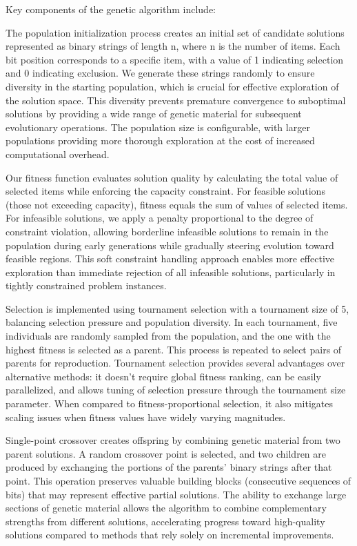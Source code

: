\documentclass[conference, a4paper]{IEEEtran}
\begin{document}
Key components of the genetic algorithm include:

The population initialization process creates an initial set of candidate solutions represented as binary strings of length n, where n is the number of items. Each bit position corresponds to a specific item, with a value of 1 indicating selection and 0 indicating exclusion. We generate these strings randomly to ensure diversity in the starting population, which is crucial for effective exploration of the solution space. This diversity prevents premature convergence to suboptimal solutions by providing a wide range of genetic material for subsequent evolutionary operations. The population size is configurable, with larger populations providing more thorough exploration at the cost of increased computational overhead.

Our fitness function evaluates solution quality by calculating the total value of selected items while enforcing the capacity constraint. For feasible solutions (those not exceeding capacity), fitness equals the sum of values of selected items. For infeasible solutions, we apply a penalty proportional to the degree of constraint violation, allowing borderline infeasible solutions to remain in the population during early generations while gradually steering evolution toward feasible regions. This soft constraint handling approach enables more effective exploration than immediate rejection of all infeasible solutions, particularly in tightly constrained problem instances.

Selection is implemented using tournament selection with a tournament size of 5, balancing selection pressure and population diversity. In each tournament, five individuals are randomly sampled from the population, and the one with the highest fitness is selected as a parent. This process is repeated to select pairs of parents for reproduction. Tournament selection provides several advantages over alternative methods: it doesn't require global fitness ranking, can be easily parallelized, and allows tuning of selection pressure through the tournament size parameter. When compared to fitness-proportional selection, it also mitigates scaling issues when fitness values have widely varying magnitudes.

Single-point crossover creates offspring by combining genetic material from two parent solutions. A random crossover point is selected, and two children are produced by exchanging the portions of the parents' binary strings after that point. This operation preserves valuable building blocks (consecutive sequences of bits) that may represent effective partial solutions. The ability to exchange large sections of genetic material allows the algorithm to combine complementary strengths from different solutions, accelerating progress toward high-quality solutions compared to methods that rely solely on incremental improvements.
\end{document}
